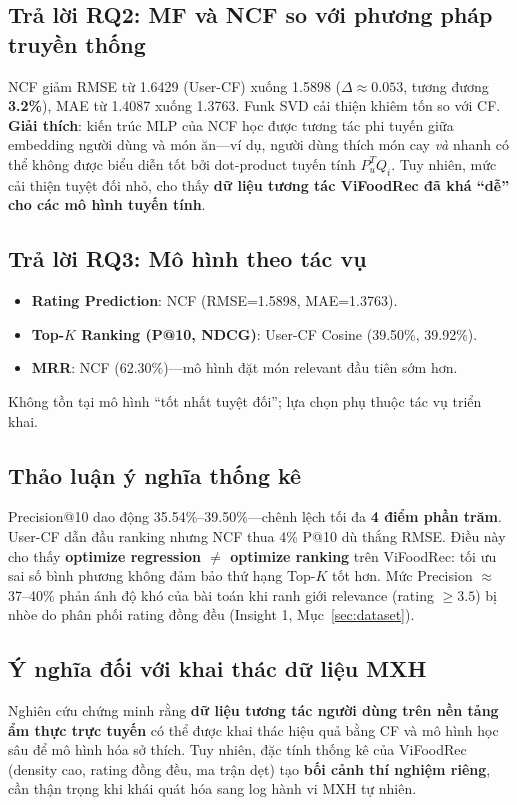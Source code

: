 \documentclass[11pt]{article}
\begin{document}
\subsection{Trả lời RQ2: MF và NCF so với phương pháp truyền thống}
NCF giảm RMSE từ 1.6429 (User-CF) xuống 1.5898 ($\Delta \approx 0.053$, tương đương \textbf{3.2\%}), MAE từ 1.4087 xuống 1.3763. Funk SVD cải thiện khiêm tốn so với CF. \textbf{Giải thích}: kiến trúc MLP của NCF học được tương tác phi tuyến giữa embedding người dùng và món ăn---ví dụ, người dùng thích món cay \textit{và} nhanh có thể không được biểu diễn tốt bởi dot-product tuyến tính $P_u^T Q_i$. Tuy nhiên, mức cải thiện tuyệt đối nhỏ, cho thấy \textbf{dữ liệu tương tác ViFoodRec đã khá ``dễ'' cho các mô hình tuyến tính}.

\subsection{Trả lời RQ3: Mô hình theo tác vụ}
\begin{itemize}
    \item \textbf{Rating Prediction}: NCF (RMSE=1.5898, MAE=1.3763).
    \item \textbf{Top-$K$ Ranking (P@10, NDCG)}: User-CF Cosine (39.50\%, 39.92\%).
    \item \textbf{MRR}: NCF (62.30\%)---mô hình đặt món relevant đầu tiên sớm hơn.
\end{itemize}
Không tồn tại mô hình ``tốt nhất tuyệt đối''; lựa chọn phụ thuộc tác vụ triển khai.

\subsection{Thảo luận ý nghĩa thống kê}
Precision@10 dao động 35.54\%--39.50\%---chênh lệch tối đa \textbf{4 điểm phần trăm}. User-CF dẫn đầu ranking nhưng NCF thua 4\% P@10 dù thắng RMSE. Điều này cho thấy \textbf{optimize regression $\neq$ optimize ranking} trên ViFoodRec: tối ưu sai số bình phương không đảm bảo thứ hạng Top-$K$ tốt hơn. Mức Precision $\approx$37--40\% phản ánh độ khó của bài toán khi ranh giới relevance (rating $\geq 3.5$) bị nhòe do phân phối rating đồng đều (Insight 1, Mục~\ref{sec:dataset}).

\subsection{Ý nghĩa đối với khai thác dữ liệu MXH}
Nghiên cứu chứng minh rằng \textbf{dữ liệu tương tác người dùng trên nền tảng ẩm thực trực tuyến} có thể được khai thác hiệu quả bằng CF và mô hình học sâu để mô hình hóa sở thích. Tuy nhiên, đặc tính thống kê của ViFoodRec (density cao, rating đồng đều, ma trận dẹt) tạo \textbf{bối cảnh thí nghiệm riêng}, cần thận trọng khi khái quát hóa sang log hành vi MXH tự nhiên.
\end{document}

